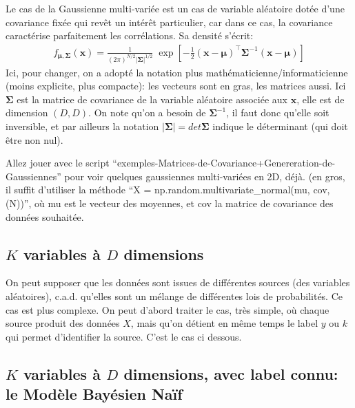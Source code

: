 \documentclass[french,twoside]{article}
\begin{document}
Le cas de la Gaussienne multi-variée est un cas de variable aléatoire dotée d'une covariance fixée qui revêt un intérêt particulier, car dans ce cas, la covariance caractérise parfaitement les corrélations.
Sa densité s'écrit:
\begin{align}
f_{\boldsymbol{\mu},\boldsymbol{\Sigma}}\left(\boldsymbol{x}\right)=
\frac{1}
{(2\pi)^{N/2} \left| \boldsymbol{\Sigma}\right|^{1/2}}\;\exp\left[
-\frac{1}{2}\left(\boldsymbol{x}-\boldsymbol{\mu}\right)^\top\boldsymbol{\Sigma}^{-1}\left(\boldsymbol{x}-\boldsymbol{\mu}\right)\right]
\end{align}
Ici, pour changer, on a adopté la notation plus mathématicienne/informaticienne (moins explicite, plus compacte): les vecteurs sont en gras, les matrices aussi. Ici $\boldsymbol{\Sigma}$ est la matrice de covariance de la variable aléatoire associée aux $\boldsymbol{x}$, elle est de dimension $(D,D)$.
On note qu'on a besoin de $\boldsymbol{\Sigma}^{-1}$, il faut donc qu'elle soit inversible, et par ailleurs la notation $\left| \boldsymbol{\Sigma}\right| = det  \boldsymbol{\Sigma}$ indique le déterminant (qui doit être non nul).

Allez jouer avec le script ``exemples-Matrices-de-Covariance+Genereration-de-Gaussiennes'' pour voir quelques gaussiennes multi-variées en 2D, déjà.
(en gros, il suffit d'utiliser la méthode  ``X = np.random.multivariate\_normal(mu, cov, (N))'', où mu est le vecteur des moyennes, et cov la matrice de covariance des données souhaitée.


\subsection{$K$ variables à $D$ dimensions}

On peut supposer que les données sont issues de différentes sources (des variables aléatoires), c.a.d. qu'elles sont un mélange de différentes lois de probabilités.
Ce cas est plus complexe. On peut d'abord traiter le cas, très simple, où chaque source produit des données $X$, mais qu'on détient en même temps le label $y$ ou $k$ qui permet d'identifier la source.
C'est le cas ci dessous.


\subsection{$K$ variables à $D$ dimensions, avec label connu: le Modèle Bayésien Naïf}
\end{document}
